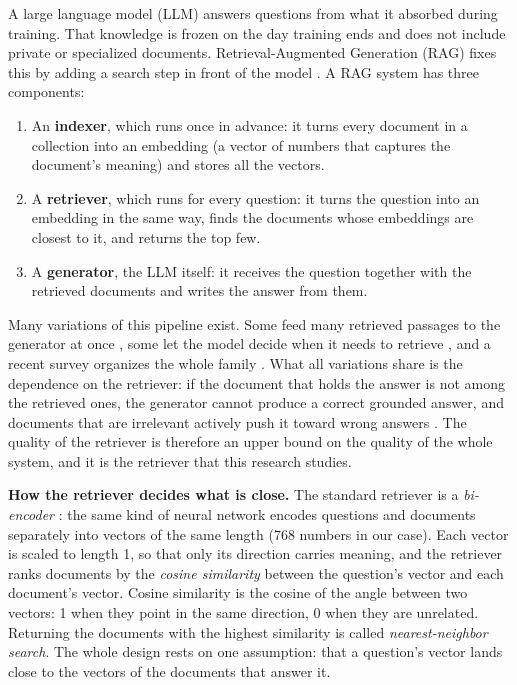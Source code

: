 \documentclass[12pt,a4paper]{article}
\begin{document}
A large language model (LLM) answers questions from what it absorbed during training. That knowledge is frozen on the day training ends and does not include private or specialized documents. Retrieval-Augmented Generation (RAG) fixes this by adding a search step in front of the model \citep{lewis2020rag}. A RAG system has three components:
\begin{enumerate}
  \item An \textbf{indexer}, which runs once in advance: it turns every document in a collection into an embedding (a vector of numbers that captures the document's meaning) and stores all the vectors.
  \item A \textbf{retriever}, which runs for every question: it turns the question into an embedding in the same way, finds the documents whose embeddings are closest to it, and returns the top few.
  \item A \textbf{generator}, the LLM itself: it receives the question together with the retrieved documents and writes the answer from them.
\end{enumerate}

Many variations of this pipeline exist. Some feed many retrieved passages to the generator at once \citep{izacard2021fid}, some let the model decide when it needs to retrieve \citep{jiang2023flare,asai2024selfrag}, and a recent survey organizes the whole family \citep{gao2023ragsurvey}. What all variations share is the dependence on the retriever: if the document that holds the answer is not among the retrieved ones, the generator cannot produce a correct grounded answer, and documents that are irrelevant actively push it toward wrong answers \citep{shi2023distractors}. The quality of the retriever is therefore an upper bound on the quality of the whole system, and it is the retriever that this research studies.

\textbf{How the retriever decides what is close.} The standard retriever is a \emph{bi-encoder} \citep{karpukhin2020dpr}: the same kind of neural network encodes questions and documents separately into vectors of the same length (768 numbers in our case). Each vector is scaled to length 1, so that only its direction carries meaning, and the retriever ranks documents by the \emph{cosine similarity} between the question's vector and each document's vector. Cosine similarity is the cosine of the angle between two vectors: 1 when they point in the same direction, 0 when they are unrelated. Returning the documents with the highest similarity is called \emph{nearest-neighbor search}. The whole design rests on one assumption: that a question's vector lands close to the vectors of the documents that answer it.
\end{document}
